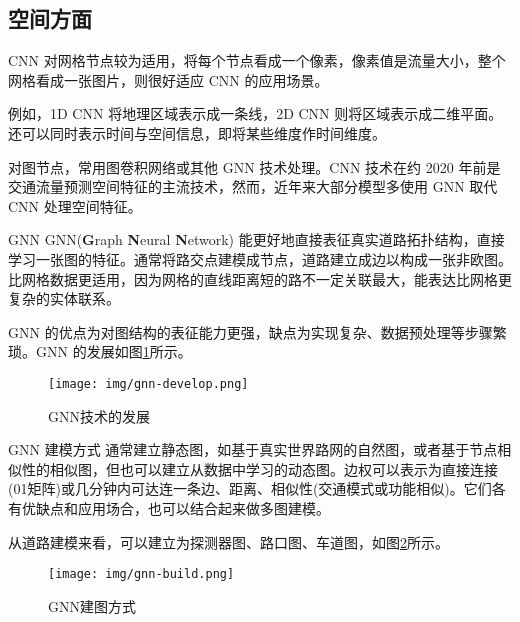 \documentclass{libs/format}
\begin{document}
\subsection{空间方面}

\begin{frame}{CNN}
  对网格节点较为适用，将每个节点看成一个像素，像素值是流量大小，整个网格看成一张图片，则很好适应 CNN 的应用场景。

  例如，1D CNN 将地理区域表示成一条线\cite{T-3}，2D CNN 则将区域表示成二维平面\cite{T-1}。还可以同时表示时间与空间信息，即将某些维度作时间维度。

  对图节点，常用图卷积网络或其他 GNN 技术处理。CNN 技术在约 2020 年前是交通流量预测空间特征的主流技术，然而，近年来大部分模型多使用 GNN 取代 CNN 处理空间特征。
\end{frame}

\begin{frame}{GNN}
  GNN(\textbf{G}raph \textbf{N}eural \textbf{N}etwork) 能更好地直接表征真实道路拓扑结构，直接学习一张图的特征。通常将路交点建模成节点，道路建立成边以构成一张非欧图。比网格数据更适用，因为网格的直线距离短的路不一定关联最大，能表达比网格更复杂的实体联系\cite{T-ZS1,T-ZS2}。

  GNN 的优点为对图结构的表征能力更强，缺点为实现复杂、数据预处理等步骤繁琐\cite{T-ZS1}。GNN 的发展如图\ref{fig:gnn-develop}所示。
  \begin{figure}
    \centering
    \texttt{[image: img/gnn-develop.png]}
    \caption{GNN技术的发展\cite{T-ZS25}}\label{fig:gnn-develop}
  \end{figure}
\end{frame}

\begin{frame}{GNN 建模方式}
  通常建立静态图，如基于真实世界路网的自然图，或者基于节点相似性的相似图，但也可以建立从数据中学习的动态图。边权可以表示为直接连接(01矩阵)或几分钟内可达连一条边、距离、相似性(交通模式或功能相似)。它们各有优缺点和应用场合，也可以结合起来做多图建模。\cite{T-ZS2}

  从道路建模来看，可以建立为探测器图、路口图、车道图，如图\ref{fig:gnn-build}所示。
  \begin{figure}
    \centering
    \texttt{[image: img/gnn-build.png]}
    \caption{GNN建图方式\cite{T-ZS20}}\label{fig:gnn-build}
  \end{figure}
\end{frame}
\end{document}
